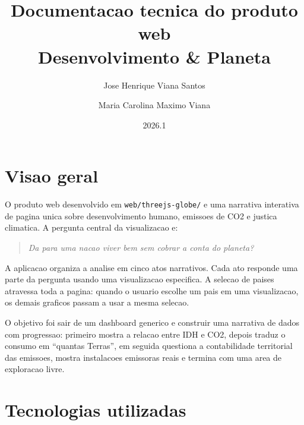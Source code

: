 \documentclass[12pt,a4paper]{article}
\title{Documentacao tecnica do produto web\\\textbf{Desenvolvimento \& Planeta}}
\author{Jose Henrique Viana Santos \and Maria Carolina Maximo Viana}
\date{2026.1}
\begin{document}
\maketitle

\section{Visao geral}

O produto web desenvolvido em \texttt{web/threejs-globe/} e uma narrativa interativa de pagina unica sobre desenvolvimento humano, emissoes de CO2 e justica climatica. A pergunta central da visualizacao e:

\begin{quote}
\textit{Da para uma nacao viver bem sem cobrar a conta do planeta?}
\end{quote}

A aplicacao organiza a analise em cinco atos narrativos. Cada ato responde uma parte da pergunta usando uma visualizacao especifica. A selecao de paises atravessa toda a pagina: quando o usuario escolhe um pais em uma visualizacao, os demais graficos passam a usar a mesma selecao.

O objetivo foi sair de um dashboard generico e construir uma narrativa de dados com progressao: primeiro mostra a relacao entre IDH e CO2, depois traduz o consumo em ``quantas Terras'', em seguida questiona a contabilidade territorial das emissoes, mostra instalacoes emissoras reais e termina com uma area de exploracao livre.

\section{Tecnologias utilizadas}
\end{document}
